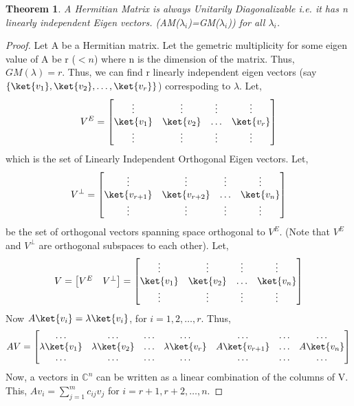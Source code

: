 \documentclass[12pt, oneside]{book}
\newtheorem{theorem}{Theorem}[section]
\theoremstyle{definition}
\theoremstyle{definition}
\theoremstyle{remark}
\begin{document}
\begin{theorem}
    A Hermitian Matrix is always Unitarily Diagonalizable i.e. it has n linearly independent Eigen vectors. (AM($\lambda_i$)=GM($\lambda_i$)) for all $\lambda_i$.
\end{theorem}
\begin{proof}
    Let A be a Hermitian matrix. Let the gemetric multiplicity for some eigen value of A be r ($<n$) where n is the dimension of the matrix.
    Thus, $GM(\lambda)=r$. Thus, we can find r linearly independent eigen vectors (say $\{\ket{v_1},\ket{v_2},\ldots,\ket{v_r}\}$) correspoding to $\lambda$.
    Let,
    \[V^E=\begin{bmatrix} \vdots & \vdots & \vdots & \vdots \\ \ket{v_1} & \ket{v_2} & \ldots & \ket{v_r} \\ \vdots & \vdots & \vdots & \vdots \end{bmatrix}\]
    which is the set of Linearly Independent Orthogonal Eigen vectors.
    Let,
    \[ V^{\perp} = \begin{bmatrix} \vdots & \vdots & \vdots & \vdots \\ \ket{v_{r+1}} & \ket{v_{r+2}} & \ldots & \ket{v_n} \\ \vdots & \vdots & \vdots & \vdots \end{bmatrix}\]
    be the set of orthogonal vectors spanning space orthogonal to $V^E$. (Note that $V^E$ and $V^{\perp}$ are orthogonal subspaces to each other).
    Let,
    \[V=\begin{bmatrix} V^E & V^{\perp} \end{bmatrix} = \begin{bmatrix} \vdots & \vdots & \vdots & \vdots \\ \ket{v_1} & \ket{v_2} & \ldots & \ket{v_n} \\ \vdots & \vdots & \vdots & \vdots \end{bmatrix}\]
    Now $A\ket{v_i}=\lambda\ket{v_i}$, for $i=1,2,\ldots,r$. Thus,
    \[ AV=\begin{bmatrix} \ldots & \ldots & \ldots & \ldots & \ldots & \ldots & \ldots \\ \lambda\ket{v_1} & \lambda\ket{v_2} & \ldots & \lambda\ket{v_r} & A\ket{v_{r+1}} & \ldots & A\ket{v_n} \\ \ldots & \ldots & \ldots & \ldots & \ldots  & \ldots & \ldots \end{bmatrix}\]
    Now, a vectors in $\mathbb{C}^n$ can be written as a linear combination of the columns of V. This, $Av_i=\sum_{j=1}^m c_{ij}v_j$ for $i=r+1,r+2,\ldots,n$.

\end{proof}
\end{document}
